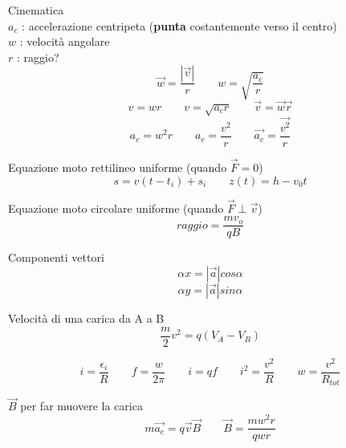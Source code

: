 \documentclass[14pt]{extarticle}
\begin{document}
Cinematica\\
$a_c$ : accelerazione centripeta (\textbf{punta} costantemente verso il centro)\\
$w$ : velocità angolare\\
$r$ : raggio?
\begin{equation*}
    \overrightarrow{w}=\frac{\left | \overrightarrow v \right |}{r}
    \quad\quad
    w=\sqrt{\frac{a_c}{r}}
\end{equation*}
\begin{equation*}
    v=wr
    \quad\quad
    v=\sqrt{a_cr}
    \quad\quad
    \overrightarrow{v}=\overrightarrow{w}\overrightarrow{r}
\end{equation*}
\begin{equation*}
    a_c=w^2r
    \quad\quad
    a_c=\frac{v^2}{r}
    \quad\quad
    \overrightarrow{a_c}=\frac{\overrightarrow{v^2}}{r}
\end{equation*}


Equazione moto rettilineo uniforme (quando $\overrightarrow{F}=0$)
\begin{equation*}
    s=v(t-t_i)+s_i
    \quad\quad
    z(t)=h-v_0t
\end{equation*}

Equazione moto circolare uniforme (quando $\overrightarrow{F}\perp\overrightarrow{v}$)
\begin{equation*}
    raggio = \frac{mv_o}{qB}
\end{equation*}

Componenti vettori
\begin{equation*}
    \alpha x= \left | \overrightarrow{a} \right |cos\alpha
\end{equation*}
\begin{equation*}
    \alpha y= \left | \overrightarrow{a} \right |sin\alpha
\end{equation*}

Velocità di una carica da A a B
\begin{equation*}
    \frac{m}{2}v^2=q(V_A-V_B)
\end{equation*}

\begin{equation*}
    i=\frac{\epsilon_i}{R}
    \quad\quad
    f=\frac{w}{2\pi}
    \quad\quad
    i=qf
    \quad\quad
    i^2=\frac{v^2}{R}
    \quad\quad
    w=\frac{v^2}{R_{tot}}
\end{equation*}

$\overrightarrow{B}$ per far muovere la carica
\begin{equation*}
    m\overrightarrow{a_c}=q\overrightarrow{v}\overrightarrow{B}
    \quad\quad
    \overrightarrow{B}=\frac{mw^2r}{qwr}
\end{equation*}
\end{document}
